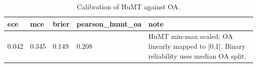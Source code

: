\begin{table}[t]
\centering
\caption{Calibration of HuMT against OA.}
\label{tab:calibration}
\begin{tabular}{lllll}
\toprule
ece & mce & brier & pearson\_humt\_oa & note \\
\midrule
0.042 & 0.345 & 0.149 & 0.208 & HuMT min-max scaled; OA linearly mapped to [0,1]. Binary reliability uses median OA split. \\
\bottomrule
\end{tabular}
\end{table}
